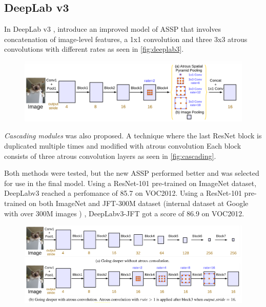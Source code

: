 \subsection{DeepLab v3}
In DeepLab v3 ,\citet{Chen2017a} introduce an improved model of ASSP that involves concatenation of image-level features, a 1x1 convolution and three 3x3 atrous convolutions with different rates as seen in \autoref{fig:deeplab3}.

\begin{figure}[H]
	\centering
	\includegraphics[width=0.8\linewidth]{fig/deeplab3.png}
	\label{fig:deeplab3}
\end{figure}

\emph{Cascading modules} was also proposed. A technique where the last ResNet block is duplicated multiple times and modified with atrous convolution Each block consists of three atrous convolution layers as seen in \autoref{fig:cascading}.

Both methods were tested, but the new ASSP performed better and was selected for use in the final model. Using a ResNet-101 pre-trained on ImageNet dataset, DeepLabv3 reached a perfomance of 85.7 on VOC2012. Using a ResNet-101 pre-trained on both ImageNet and JFT-300M dataset (internal dataset at Google with over 300M images \cite{Hinton2015}\cite{Sun2017}) , DeepLabv3-JFT got a score of 86.9 on VOC2012.

\begin{figure}[H]
	\centering
	\includegraphics[width=0.8\linewidth]{fig/cascading.png}
	\label{fig:cascading}
\end{figure}



